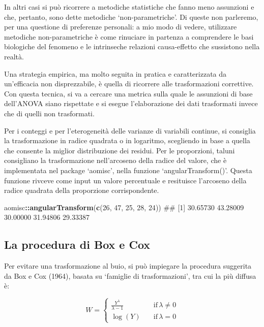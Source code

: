 \documentclass[a4paper,12pt,oneside]{book}
\newenvironment{Shaded}{\begin{snugshade}}{\end{snugshade}}
\newcommand{\KeywordTok}[1]{\textcolor[rgb]{0.13,0.29,0.53}{\textbf{#1}}}
\newcommand{\DecValTok}[1]{\textcolor[rgb]{0.00,0.00,0.81}{#1}}
\newcommand{\OperatorTok}[1]{\textcolor[rgb]{0.81,0.36,0.00}{\textbf{#1}}}
\newcommand{\NormalTok}[1]{#1}
\theoremstyle{definition}
\theoremstyle{definition}
\theoremstyle{definition}
\theoremstyle{remark}
\begin{document}
In altri casi si può ricorrere a metodiche statistiche che fanno meno
assunzioni e che, pertanto, sono dette metodiche `non-parametriche'. Di
queste non parleremo, per una questione di preferenze personali: a mio
modo di vedere, utilizzare metodiche non-parametriche è come rinuciare
in partenza a comprendere le basi biologiche del fenomeno e le
intrinseche relazioni causa-effetto che sussistono nella realtà.

Una strategia empirica, ma molto seguita in pratica e caratterizzata da
un'efficacia non disprezzabile, è quella di ricorrere alle
trasformazioni correttive. Con questa tecnica, si va a cercare una
metrica sulla quale le assunzioni di base dell'ANOVA siano rispettate e
si esegue l'elaborazione dei dati trasformati invece che di quelli non
trasformati.

Per i conteggi e per l'eterogeneità delle varianze di variabili
continue, si consiglia la trasformazione in radice quadrata o in
logaritmo, scegliendo in base a quella che consente la miglior
distribuzione dei residui. Per le proporzioni, taluni consigliano la
trasformazione nell'arcoseno della radice del valore, che è implementata
nel package `aomisc', nella funzione `angularTransform()'. Questa
funzione rivceve come input un valore percentuale e resituisce
l'arcoseno della radice quadrata della proporzione corrispondente.

\begin{Shaded}
\begin{Highlighting}[]
\NormalTok{aomisc}\OperatorTok{::}\KeywordTok{angularTransform}\NormalTok{(}\KeywordTok{c}\NormalTok{(}\DecValTok{26}\NormalTok{, }\DecValTok{47}\NormalTok{, }\DecValTok{25}\NormalTok{, }\DecValTok{28}\NormalTok{, }\DecValTok{24}\NormalTok{))}
\NormalTok{## [1] 30.65730 43.28009 30.00000 31.94806 29.33387}
\end{Highlighting}
\end{Shaded}

\subsection{La procedura di Box e Cox}\label{la-procedura-di-box-e-cox}

Per evitare una trasformazione al buio, si può impiegare la procedura
suggerita da Box e Cox (1964), basata su `famiglie di trasformazioni',
tra cui la più diffusa è:

\[ W = \left\{ \begin{array}{ll}
\frac{Y^\lambda}{\lambda - 1} & \quad \textrm{if} \, \lambda \neq 0 \\
\log(Y) & \quad \textrm{if} \, \lambda = 0
\end{array} \right. \]
\end{document}
